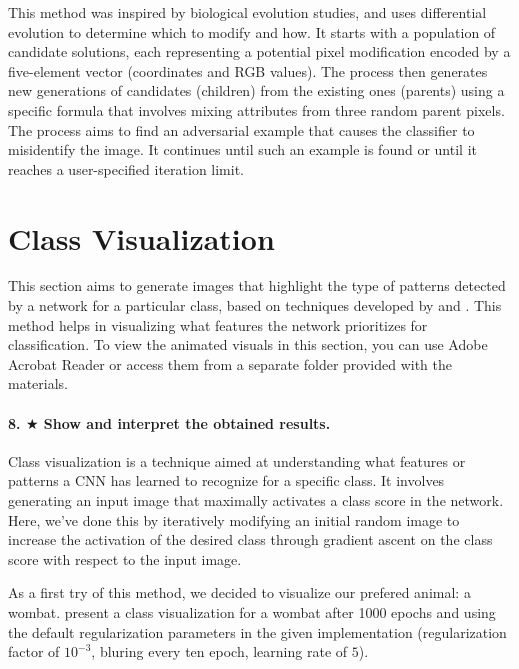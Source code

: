 This method was inspired by biological evolution studies, and uses differential evolution to determine which to modify and how. It starts with a population of candidate solutions, each representing a potential pixel modification encoded by a five-element vector (coordinates and RGB values). The process then generates new generations of candidates (children) from the existing ones (parents) using a specific formula that involves mixing attributes from three random parent pixels. The process aims to find an adversarial example that causes the classifier to misidentify the image. It continues until such an example is found or until it reaches a user-specified iteration limit.

\section{Class Visualization}

This section aims to generate images that highlight the type of patterns detected by a network for a particular class, based on techniques developed by \cite{simonyan2014deep} and \cite{yosinski2015understanding}. This method helps in visualizing what features the network prioritizes for classification. To view the animated visuals in this section, you can use Adobe Acrobat Reader or access them from a separate folder provided with the materials.

\paragraph*{8. $ \bigstar $ Show and interpret the obtained results.}
Class visualization is a technique aimed at understanding what features or patterns a CNN has learned to recognize for a specific class. It involves generating an input image that maximally activates a class score in the network. Here, we've done this by iteratively modifying an initial random image to increase the activation of the desired class through gradient ascent on the class score with respect to the input image.

As a first try of this method, we decided to visualize our prefered animal: a wombat.  present a class visualization for a wombat after 1000 epochs and using the default regularization parameters in the given implementation (regularization factor of $10^{-3}$, bluring every ten epoch, learning rate of $5$). 

